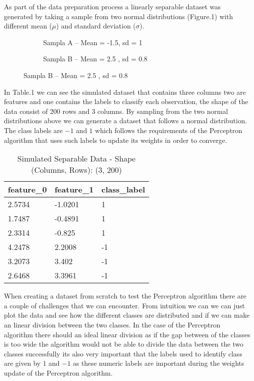 \documentclass[12pt]{article} %
\begin{document}
As part of the data preparation process a linearly separable dataset was generated by taking a sample from two normal distributions (Figure.1) with different mean ($\mu$) and standard deviation ($\sigma$).

\begin{figure}[htb]
\caption{Sample Normal Distributions}\label{fig:barplots01}
\hspace*{-1.9cm}
    \begin{subfigure}[b]{0.6\textwidth}
        \caption{Sampla A -- Mean = -1.5, sd = 1}
        \label{fig:output_0}
    \end{subfigure}
    \begin{subfigure}[b]{0.6\textwidth}
        \caption{Sampla B -- Mean = 2.5 , sd = 0.8}
        \label{fig:output_1}
    \end{subfigure}
\end{figure}


In Table.1 we can see the simulated dataset that contains three columns two are features and one contains the labels to classify each observation, the shape of the data consist of 200 rows and 3 columns. By sampling from the two normal distributions above we can generate a dataset that follows a normal distribution. The class labels are $-1$ and $1$ which follows the requirements of the Perceptron algorithm that uses such labels to update its weights in order to converge. 

\begin{table}[ht]
\centering
\caption{Simulated Separable Data  - Shape (Columns, Rows): (3, 200)}
\begin{tabular}{@{}lll@{}}
\toprule
\textbf{feature\_0} & \textbf{feature\_1} & \textbf{class\_label} \\ \midrule
2.5734 & -1.0201 & 1 \\
1.7487 & -0.4891 & 1 \\
2.3314 & -0.825 & 1 \\
4.2478 & 2.2008 & -1 \\
3.2073&3.402& -1\\
2.6468&3.3961&-1\\ \bottomrule
\end{tabular}
\end{table}


When creating a dataset from scratch to test the Perceptron algorithm there are a couple of challenges that we can encounter. From intuition we can we can just plot the data and see how the different classes are distributed and if we can make an linear division between the two classes. In the case of the Perceptron algorithm there should an ideal linear division as if the gap between of the classes is too wide the algorithm would not be able to divide the data between the two classes successfully its also very important that the labels used to identify class are given by $1$ and $-1$ as these numeric labels are important during the weights update of the Perceptron algorithm.
\end{document}
